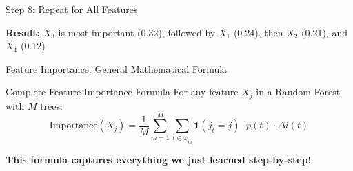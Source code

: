 \documentclass[10pt]{beamer}
\begin{document}
\begin{frame}{Step 8: Repeat for All Features}
\begin{center}
\end{center}

\vspace{0.5cm}

\begin{keypointsbox}
\textbf{Result:} $X_3$ is most important (0.32), followed by $X_1$ (0.24), then $X_2$ (0.21), and $X_4$ (0.12)
\end{keypointsbox}
\end{frame}

\begin{frame}{Feature Importance: General Mathematical Formula}
\begin{definitionbox}{Complete Feature Importance Formula}
For any feature $X_j$ in a Random Forest with $M$ trees:
$$\text{Importance}(X_j) = \frac{1}{M} \sum_{m=1}^M \sum_{t \in \varphi_{m}} \mathbf{1}(j_t = j) \cdot p(t) \cdot \Delta i(t)$$
\end{definitionbox}

\vspace{1cm}

\begin{alertbox}
\textbf{This formula captures everything we just learned step-by-step!}
\end{alertbox}
\end{frame}
\end{document}
